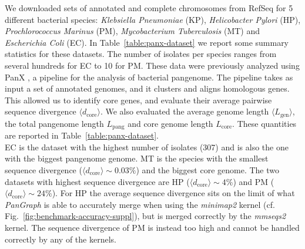 \documentclass[aps,rmp,reprint,superscriptaddress,notitlepage,10pt,onecolumn]{revtex4-1}
\newcommand{\avg}[1]{\langle #1 \rangle}
\newcommand{\Lcore}{L_\text{core}}
\newcommand{\Lpang}{L_\text{pang}}
\newcommand{\Lgen}{L_\text{gen}}
\newcommand{\dcore}{\langle d_\text{core} \rangle}
\begin{document}
We downloaded sets of annotated and complete chromosomes from RefSeq \cite{o2016reference} for 5 different bacterial species: \textit{Klebsiella Pneumoniae} (KP), \textit{Helicobacter Pylori} (HP), \textit{Prochlorococcus Marinus} (PM), \textit{Mycobacterium Tuberculosis} (MT) and \textit{Escherichia Coli} (EC). In Table~\ref{table:panx-dataset} we report some summary statistics for these datasets. The number of isolates per species ranges from several hundreds for EC to 10 for PM.
These data were previously analyzed using PanX \cite{ding2018panx}, a pipeline for the analysis of bacterial pangenome. The pipeline takes as input a set of annotated genomes, and it clusters and aligns homologous genes. This allowed us to identify core genes, and evaluate their average pairwise sequence divergence $\avg{d_\text{core}}$. We also evaluated the average genome length $
    \avg{\Lgen}$, the total pangenome length $\Lpang$ and core genome length $\Lcore$. These quantities are reported in Table~\ref{table:panx-dataset}.\\
EC is the dataset with the highest number of isolates (307) and is also the one with the biggest pangenome genome. MT is the species with the smallest sequence divergence ($\dcore \sim 0.03\%$) and the biggest core genome. The two datasets with highest sequence divergence are HP ($\dcore \sim 4\%$) and PM ($\dcore \sim 24\%$). For HP the average sequence divergence sits on the limit of what \textit{PanGraph} is able to accurately merge when using the \textit{minimap2} kernel (cf. Fig.~\ref{fig:benchmark-accuracy-suppl}), but is merged correctly by the \textit{mmseqs2} kernel. The sequence divergence of PM is instead too high and cannot be handled correctly by any of the kernels.
\end{document}
